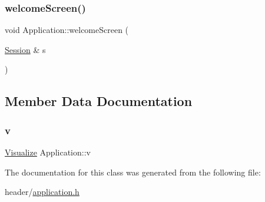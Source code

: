\mbox{\label{class_application_abf73a60a6a2e4b83a675de777273d12c}} 
\subsubsection{\texorpdfstring{welcome\+Screen()}{welcomeScreen()}}
{\footnotesize\ttfamily void Application\+::welcome\+Screen (\begin{DoxyParamCaption}\item[{\hyperlink{struct_session}{Session} \&}]{s }\end{DoxyParamCaption})}



\subsection{Member Data Documentation}
\mbox{\label{class_application_a96cff2295a95d7e6de06638bb7e61243}} 
\subsubsection{\texorpdfstring{v}{v}}
{\footnotesize\ttfamily \hyperlink{class_visualize}{Visualize} Application\+::v}



The documentation for this class was generated from the following file\+:\begin{DoxyCompactItemize}
\item 
header/\hyperlink{application_8h}{application.\+h}\end{DoxyCompactItemize}
